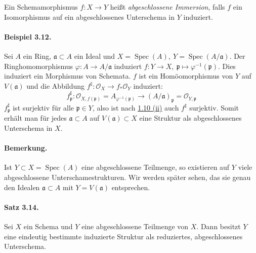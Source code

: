 \documentclass[11pt,b5paper,openany]{memoir}
\begin{document}
Ein Schemamorphismus $f:X\to Y$ heißt \textit{abgeschlossene Immersion}, falls $f$ ein Isomorphismus auf ein abgeschlossenes Unterschema in $Y$ induziert.

\paragraph{Beispiel 3.12.}\label{3.12} Sei $A$ ein Ring, $\mathfrak{a}\subset A$ ein Ideal und $X=\operatorname{Spec}(A),\ Y=\operatorname{Spec}(A/\mathfrak{a})$. Der Ringhomomorphismus $\varphi:A\to A/\mathfrak{a}$ induziert $f:Y\to X,\ \mathfrak{p}\mapsto\varphi^{-1}(\mathfrak{p})$. Dies induziert ein Morphismus von Schemata. $f$ ist ein Homöomorphismus von $Y$ auf $V(\mathfrak{a})$ und die Abbildung $f^\sharp:\mathcal{O}_X\to f_\ast\mathcal{O}_Y$ induziert: 
\[f_\mathfrak{p}^\sharp:\mathcal{O}_{X, f(\mathfrak{p})}=A_{\varphi^{-1}(\mathfrak{p})}\to (A/\mathfrak{a})_\mathfrak{p}=\mathcal{O}_{Y,\mathfrak{p}}\]
$f_\mathfrak{p}^\sharp$ ist surjektiv für alle $\mathfrak{p}\in Y$, also ist nach \hyperref[1.10]{1.10 (ii)} auch $f^\sharp$ surjektiv. Somit erhält man für jedes $\mathfrak{a}\subset A$ auf $V(\mathfrak{a})\subset X$ eine Struktur als abgeschlossenes Unterschema in $X$.

\paragraph{Bemerkung.} Ist $Y\subset X=\operatorname{Spec}(A)$ eine abgeschlossene Teilmenge, so existieren auf $Y$ viele abgeschlossene Unterschamestrukturen. Wir werden später sehen, das sie genau den Idealen $\mathfrak{a}\subset A$ mit $Y=V(\mathfrak{a})$ entsprechen.

\paragraph{Satz 3.14.}\label{3.14} Sei $X$ ein Schema und $Y$ eine abgeschlossene Teilmenge von $X$. Dann besitzt $Y$ eine eindeutig bestimmte induzierte Struktur als reduziertes, abgeschlossenes Unterschema.

\iffalse
\end{document}
